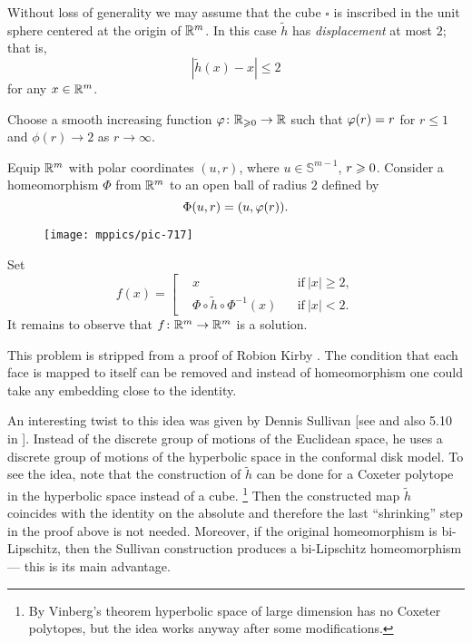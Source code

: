 Without loss of generality we may assume that the cube $\square$ is inscribed in the unit sphere centered at the origin of $\mathbb{R}^m$.
In this case $\tilde h$ has \emph{displacement} at most $2$;
that is, 
\[|\tilde h(x)-x|\le 2\]
for any $x\in\mathbb{R}^m$.

Choose a smooth increasing function $\varphi\colon\mathbb{R}_{\geqslant 0} \to\mathbb{R}$ such that
$\phi(r)\z=r$
for $r\le 1$ and $\phi(r)\to 2$ as $r\to\infty$.

Equip $\mathbb{R}^m$ with polar coordinates $(u,r)$, 
where $u\in\mathbb{S}^{m-1}$, $r\z\ge 0$.
Consider a homeomorphism $\Phi$ from $\mathbb{R}^m$ to an open ball of radius $2$
defined by 
\[\Phi(u,r)\z=(u,\phi(r)).\]



\begin{wrapfigure}{o}{41 mm}
\vskip-0mm
\centering
\texttt{[image: mppics/pic-717]}
\vskip0mm
\end{wrapfigure}

Set 
\[
f(x)=\left[
\begin{aligned}
&x&&\text{if}\ |x|\ge 2,
\\
&\Phi\circ \tilde h \circ \Phi^{-1}(x)&&\text{if}\ |x|< 2.
\end{aligned}
\right.
\]
It remains to observe that $f\colon\mathbb{R}^m\to\mathbb{R}^m$ is a solution.
\qeds

This problem is stripped from a proof of Robion Kirby \cite{kirby}.
The condition that each face is mapped to itself can be removed and 
instead of homeomorphism one could take any embedding close to the identity.

An interesting twist to this idea was given by Dennis Sullivan [see  and also 5.10 in ].
Instead of the discrete group of motions of the Euclidean space,
he uses a discrete group of motions of the hyperbolic space in the conformal disk model.
To see the idea, note that the construction of $\tilde h$ can be done for a Coxeter polytope in the hyperbolic space instead of a cube.%
\footnote{By Vinberg's theorem \cite{vinberg, vinberg-strong} hyperbolic space of large dimension has no Coxeter polytopes, but the idea works anyway after some modifications.}
Then the constructed map $\tilde h$
coincides with the identity on the absolute and therefore the last ``shrinking'' step in the proof above is not needed.
Moreover, 
if the original homeomorphism is bi-Lipschitz,
then the Sullivan construction produces a bi-Lipschitz homeomorphism ---
this is its main advantage.

  

